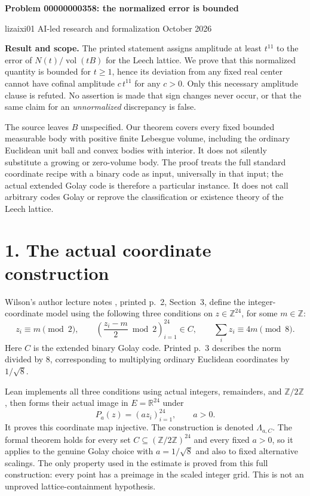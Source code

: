 \documentclass[10pt]{article}
\begin{document}
\begin{center}
{\Large\bfseries Problem 00000000358: the normalized error is bounded}

lizaixi01 \quad AI-led research and formalization  October 2026
\end{center}
\textbf{Result and scope.} The printed statement assigns amplitude at least $t^{11}$ to the error of $N(t)/\operatorname{vol}(tB)$ for the Leech lattice. We prove that this normalized quantity is bounded for $t\ge1$, hence its deviation from any fixed real center cannot have cofinal amplitude $c\,t^{11}$ for any $c>0$. Only this necessary amplitude clause is refuted. No assertion is made that sign changes never occur, or that the same claim for an \emph{unnormalized} discrepancy is false.

The source leaves $B$ unspecified. Our theorem covers every fixed bounded measurable body with positive finite Lebesgue volume, including the ordinary Euclidean unit ball and convex bodies with interior. It does not silently substitute a growing or zero-volume body. The proof treats the full standard coordinate recipe with a binary code as input, universally in that input; the actual extended Golay code is therefore a particular instance. It does not call arbitrary codes Golay or reprove the classification or existence theory of the Leech lattice.

\section*{1. The actual coordinate construction}
Wilson's author lecture notes \cite{W}, printed p.~2, Section~3, define the integer-coordinate model using the following three conditions on $z\in\mathbb Z^{24}$, for some $m\in\mathbb Z$:
\[
 z_i\equiv m\pmod2,\qquad
 \left(\frac{z_i-m}{2}\bmod2\right)_{i=1}^{24}\in C,\qquad
 \sum_i z_i\equiv4m\pmod8.
\]
Here $C$ is the extended binary Golay code. Printed p.~3 describes the norm divided by $8$, corresponding to multiplying ordinary Euclidean coordinates by $1/\sqrt8$.

Lean implements all three conditions using actual integers, remainders, and $\mathbb Z/2\mathbb Z$, then forms their actual image in $E=\mathbb R^{24}$ under
\[
 P_a(z)=(az_i)_{i=1}^{24},\qquad a>0.
\]
It proves this coordinate map injective. The construction is denoted $\Lambda_{a,C}$. The formal theorem holds for every set $C\subseteq(\mathbb Z/2\mathbb Z)^{24}$ and every fixed $a>0$, so it applies to the genuine Golay choice with $a=1/\sqrt8$ and also to fixed alternative scalings. The only property used in the estimate is proved from this full construction: every point has a preimage in the scaled integer grid. This is not an unproved lattice-containment hypothesis.
\end{document}
